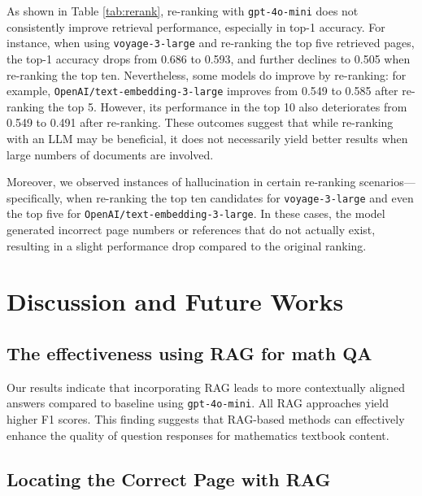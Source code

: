 \documentclass[runningheads]{llncs}
\begin{document}
As shown in Table \ref{tab:rerank}, re-ranking with \texttt{gpt-4o-mini} does not consistently improve retrieval performance, especially in top-1 accuracy. For instance, when using \texttt{voyage-3-large} and re-ranking the top five retrieved pages, the top-1 accuracy drops from 0.686 to 0.593, and further declines to 0.505 when re-ranking the top ten. Nevertheless, some models do improve by re-ranking: for example, \texttt{OpenAI/text-embedding-3-large} improves from 0.549 to 0.585 after re-ranking the top 5. However, its performance in the top 10 also deteriorates from 0.549 to 0.491 after re-ranking. These outcomes suggest that while re-ranking with an LLM may be beneficial, it does not necessarily yield better results when large numbers of documents are involved.

Moreover, we observed instances of hallucination in certain re-ranking scenarios—specifically, when re-ranking the top ten candidates for \texttt{voyage-3-large} and even the top five for \texttt{OpenAI/text-embedding-3-large}. In these cases, the model generated incorrect page numbers or references that do not actually exist, resulting in a slight performance drop compared to the original ranking.


\section{Discussion and Future Works}\label{sec5}


\subsection{The effectiveness using RAG for math QA}

Our results indicate that incorporating RAG leads to more contextually aligned answers compared to baseline using \texttt{gpt-4o-mini}. All RAG approaches yield higher F1 scores. This finding suggests that RAG-based methods can effectively enhance the quality of question responses for mathematics textbook content.

\subsection{Locating the Correct Page with RAG} \label{sec:page_retrieval}
\end{document}
